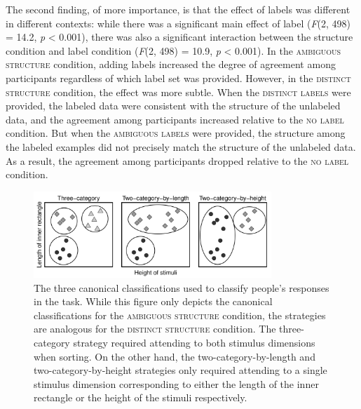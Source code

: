 \documentclass[a4paper, doc]{apa6}
\begin{document}
The second finding, of more importance, is that the effect of labels was different in different contexts: while there was a significant main effect of label (\textit{F}(2, 498) = 14.2, \textit{p} < 0.001), there was also a significant interaction between the structure condition and label condition (\textit{F}(2, 498) = 10.9, \textit{p} < 0.001). In the \textsc{ambiguous structure} condition, adding labels increased the degree of agreement among participants regardless of which label set was provided. However, in the \textsc{distinct structure} condition, the effect was more subtle. When the \textsc{distinct labels} were provided, the labeled data were consistent with the structure of the unlabeled data, and the agreement among participants increased relative to the \textsc{no label} condition. But when the \textsc{ambiguous labels} were provided, the structure among the labeled examples did not precisely match the structure of the unlabeled data. As a result, the agreement among participants dropped relative to the \textsc{no label} condition.


\begin{figure}[t]
  \begin{center}
\includegraphics[width=0.8\textwidth]{figures/canonical-strategies-two.pdf}
    \caption{The three canonical classifications used to classify people's responses in the task. While this figure only depicts the canonical classifications for the \textsc{ambiguous structure} condition, the strategies are analogous for the \textsc{distinct structure} condition. The three-category strategy required attending to both stimulus dimensions when sorting. On the other hand, the two-category-by-length and two-category-by-height strategies only required attending to a single stimulus dimension corresponding to either the length of the inner rectangle or the height of the stimuli respectively.}
    \label{canonical-classifications}
  \end{center}
\end{figure}
\end{document}
